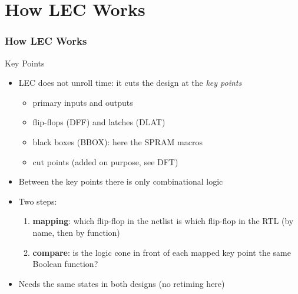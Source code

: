 \documentclass{beamer}
\newcommand{\astitle}{nix}
\newcommand{\assubtitle}{nix}
\begin{document}
\section{How LEC Works}
\renewcommand{\astitle}{How LEC Works}

\renewcommand{\assubtitle}{Key Points}
\begin{frame}
\frametitle{\astitle}
\begin{block}{\assubtitle}
  \begin{itemize}
    \item LEC does not unroll time: it cuts the design at the
      \emph{key points}
    \begin{itemize}
      \item primary inputs and outputs
      \item flip-flops (DFF) and latches (DLAT)
      \item black boxes (BBOX): here the SPRAM macros
      \item cut points (added on purpose, see DFT)
    \end{itemize}
    \item Between the key points there is only combinational logic
    \item Two steps:
    \begin{enumerate}
      \item \textbf{mapping}: which flip-flop in the netlist is which
        flip-flop in the RTL (by name, then by function)
      \item \textbf{compare}: is the logic cone in front of each mapped
        key point the same Boolean function?
    \end{enumerate}
    \item Needs the same states in both designs (no retiming here)
  \end{itemize}
\end{block}
\end{frame}
\end{document}
